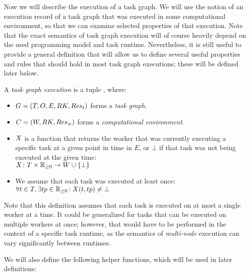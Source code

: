 Now we will describe the execution of a task graph. We will use the notion of an execution
record of a task graph that was executed in some computational environment, so that we can examine
selected properties of that execution. Note that the exact semantics of task graph execution
will of course heavily depend on the used programming model and task runtime. Nevertheless,
it is still useful to provide a general definition that will allow us to define several useful
properties and rules that should hold in most task graph executions; these will be defined
later below.

\vspace{2mm} A \emph{task graph execution} is a tuple
\taskgraphexecution, where:
\begin{itemize}[itemsep=0pt]
	\item $G = (T, O, E, RK, Res_t)$ forms a \emph{task graph}.
	\item $C = (W, RK, Res_w)$ forms a \emph{computational environment}.
	\item $X$ is a function that returns the worker that was currently
	      executing a specific task at a given point in time in $E$, or $\bot$ if that task was not
	      being executed at the given time: \\ $X\colon T \times \mathbb{R}_{\geq{}0} \rightarrow W \cup \{\bot\}$
    \item We assume that each task was executed at least once: $\forall t\in{}T, \exists tp\in\mathbb{R}_{\geq{}0}\colon X(t, tp) \neq \bot$
\end{itemize}

Note that this definition assumes that each task is executed on at most a single worker at a time.
It could be generalized for tasks that can be executed on multiple workers at once; however, that
would have to be performed in the context of a specific task runtime, as the semantics of
\emph{multi-node} execution can vary significantly between runtimes.

We will also define the following helper functions, which will be used in later definitions:

